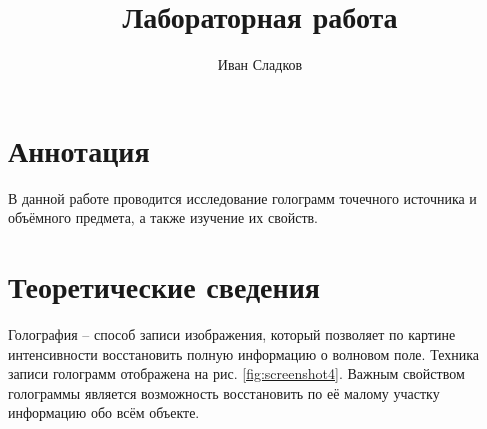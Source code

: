 \documentclass[a4paper]{article}
\title{Лабораторная работа \labnum \space \labname} %
\author{Иван Сладков}
\begin{document}
\maketitle
\thispagestyle{empty}
\section{Аннотация}
В данной работе проводится исследование голограмм точечного источника и объёмного предмета, а также изучение их свойств.

\section{Теоретические сведения}

Голография -- способ записи изображения, который позволяет по картине интенсивности восстановить полную информацию о волновом поле. Техника записи голограмм отображена на рис. \ref{fig:screenshot4}. Важным свойством голограммы является возможность восстановить по её малому участку информацию обо всём объекте. 
\end{document}
